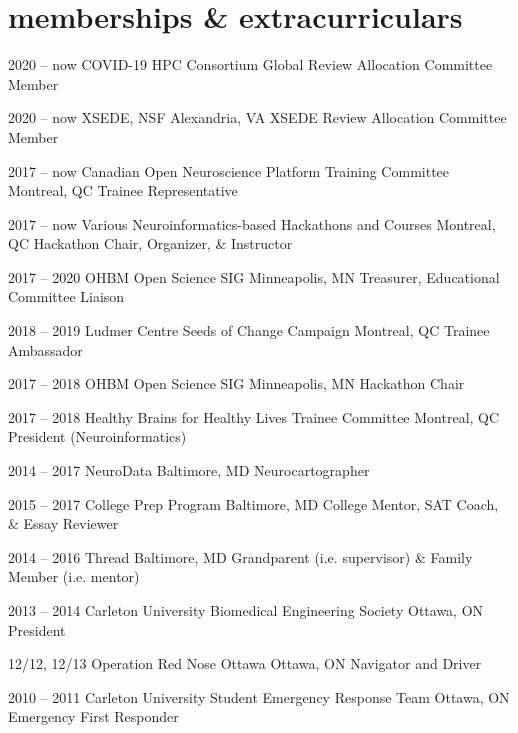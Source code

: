 \documentclass[]{friggeri-cv} %
\begin{document}
\section{memberships \& extracurriculars}

\begin{entrylist}
\entry
{2020 -- now}
{COVID-19 HPC Consortium}
{Global}
{Review Allocation Committee Member}

\entry
{2020 -- now}
{XSEDE, NSF}
{Alexandria, VA}
{XSEDE Review Allocation Committee Member}

\entry
{2017 -- now}
{Canadian Open Neuroscience Platform Training Committee}
{Montreal, QC}
{Trainee Representative}

\entry
{2017 -- now}
{Various Neuroinformatics-based Hackathons and Courses}
{Montreal, QC}
{Hackathon Chair, Organizer, \& Instructor}

\entry
{2017 -- 2020}
{OHBM Open Science SIG}
{Minneapolis, MN}
{Treasurer, Educational Committee Liaison}

\entry
{2018 -- 2019}
{Ludmer Centre Seeds of Change Campaign}
{Montreal, QC}
{Trainee Ambassador}

\entry
{2017 -- 2018}
{OHBM Open Science SIG}
{Minneapolis, MN}
{Hackathon Chair}

\entry
{2017 -- 2018}
{Healthy Brains for Healthy Lives Trainee Committee}
{Montreal, QC}
{President (Neuroinformatics)}

\entry
{2014 -- 2017}
{NeuroData}
{Baltimore, MD}
{Neurocartographer}

\entry
{2015 -- 2017}
{College Prep Program}
{Baltimore, MD}
{College Mentor, SAT Coach, \& Essay Reviewer}

\entry
{2014 -- 2016}
{Thread}
{Baltimore, MD}
{Grandparent (i.e. supervisor) \& Family Member (i.e. mentor) }

\entry
{2013 -- 2014}
{Carleton University Biomedical Engineering Society}
{Ottawa, ON}
{President}

\entry
{12/12, 12/13}
{Operation Red Nose Ottawa}
{Ottawa, ON}
{Navigator and Driver}

\entry
{2010 -- 2011}
{Carleton University Student Emergency Response Team}
{Ottawa, ON}
{Emergency First Responder}
\end{entrylist}

\clearpage
\end{document}
